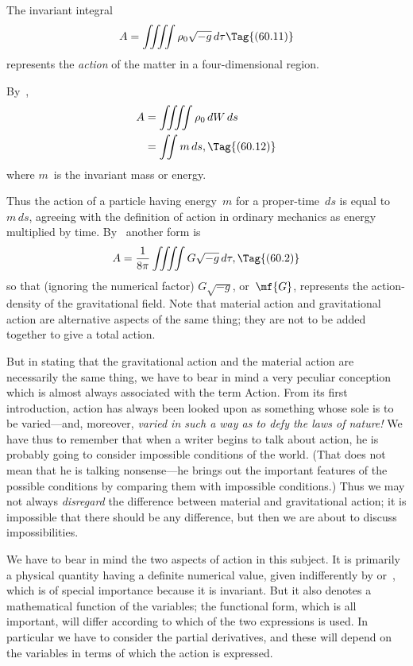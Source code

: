 \documentclass[12pt]{book}
\begin{document}

The invariant integral
\[
A = \iiiint \rho_{0} \sqrt{-g}\, d\tau
\Tag{(60.11)}
\]
represents the \emph{action} of the matter in a four\hyp{}dimensional region.

By~,
\begin{align*}
  A &= \iiiint \rho_{0}\, dW\, ds \\
  &= \iint m\, ds,
  \Tag{(60.12)}
\end{align*}
where $m$~is the invariant mass or energy.

Thus the action of a particle having energy~$m$ for a proper\hyp{}time~$ds$ is
equal to~$m\, ds$, agreeing with the definition of action in ordinary mechanics as
energy multiplied by time. By~ another form is
\[
A = \frac{1}{8\pi} \iiiint G\sqrt{-g}\, d\tau,
\Tag{(60.2)}
\]
so that (ignoring the numerical factor) $G\sqrt{-g}$, or~$\mf{G}$, represents the action\hyp{}density
of the gravitational field. Note that material action and gravitational
action are alternative aspects of the same thing; they are not to be added
together to give a total action.

But in stating that the gravitational action and the material action are
necessarily the same thing, we have to bear in mind a very peculiar conception
which is almost always associated with the term Action. From its first introduction,
action has always been looked upon as something whose sole 
is to be varied---and, moreover, \emph{varied in such a way as to defy the laws
of nature!} We have thus to remember that when a writer begins to talk
about action, he is probably going to consider impossible conditions of the
world. (That does not mean that he is talking nonsense---he brings out the
important features of the possible conditions by comparing them with impossible
conditions.) Thus we may not always \emph{disregard} the difference between material
and gravitational action; it is impossible that there should be any difference,
but then we are about to discuss impossibilities.

We have to bear in mind the two aspects of action in this subject. It is
primarily a physical quantity having a definite numerical value, given indifferently
by  or~, which is of special importance because it is
invariant. But it also denotes a mathematical function of the variables; the
functional form, which is all important, will differ according to which of the
two expressions is used. In particular we have to consider the partial derivatives,
and these will depend on the variables in terms of which the action is
expressed.
\end{document}
